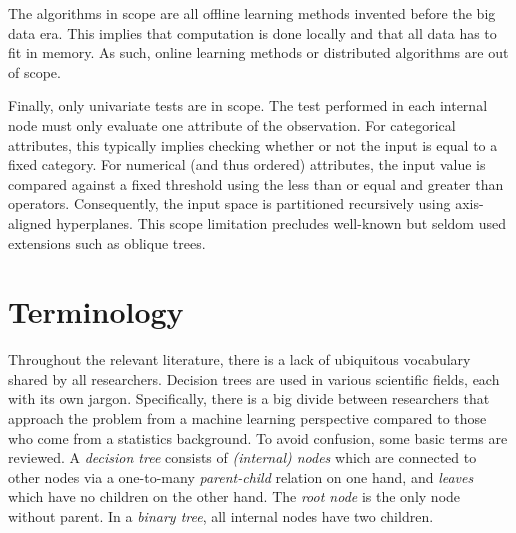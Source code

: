 The algorithms in scope are all offline learning methods invented before the big data era. This implies that computation is done locally and that all data has to fit in memory. As such, online learning methods or distributed algorithms are out of scope.

Finally, only univariate tests are in scope. The test performed in each internal node must only evaluate one attribute of the observation. For categorical attributes, this typically implies checking whether or not the input is equal to a fixed category. For numerical (and thus ordered) attributes, the input value is compared against a fixed threshold using the less than or equal and greater than operators. Consequently, the input space is partitioned recursively using axis-aligned hyperplanes. This scope limitation precludes well-known but seldom used extensions such as oblique trees.


\section{Terminology}
Throughout the relevant literature, there is a lack of ubiquitous vocabulary shared by all researchers. Decision trees are used in various scientific fields, each with its own jargon. Specifically, there is a big divide between researchers that approach the problem from a machine learning perspective compared to those who come from a statistics background. To avoid confusion, some basic terms are reviewed. A \emph{decision tree} consists of \emph{(internal) nodes} which are connected to other nodes via a one-to-many \emph{parent-child} relation on one hand, and \emph{leaves} which have no children on the other hand. The \emph{root node} is the only node without parent. In a \emph{binary tree}, all internal nodes have two children.

